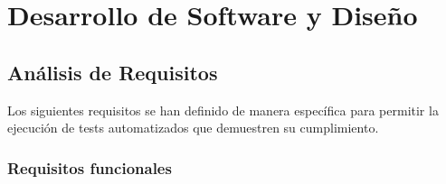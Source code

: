 %
%
\chapter{Desarrollo de Software y Diseño}
\label{cap:desarrollo}

\section{Análisis de Requisitos}
\label{sec:requisitos}

Los siguientes requisitos se han definido de manera específica para permitir
la ejecución de tests automatizados que demuestren su cumplimiento.

\subsection{Requisitos funcionales}
\label{sec:rf}

